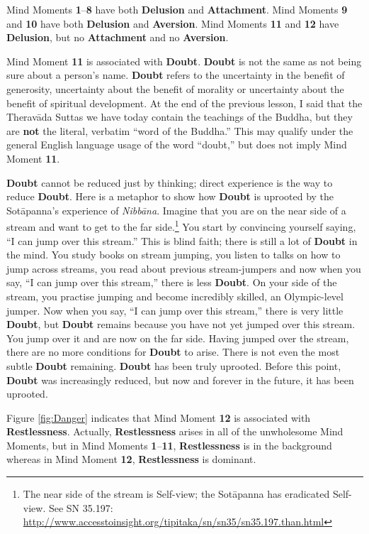 Mind Moments \textbf{1}--\textbf{8} have both \textbf{Delusion} and \textbf{Attachment}. Mind Moments \textbf{9} and \textbf{10} have both \textbf{Delusion} and \textbf{Aversion}. Mind Moments \textbf{11} and \textbf{12} have \textbf{Delusion}, but no \textbf{Attachment} and no \textbf{Aversion}.

Mind Moment \textbf{11} is associated with \textbf{Doubt}. \textbf{Doubt} is not the same as not being sure about a person’s name. \textbf{Doubt} refers to the uncertainty in the benefit of generosity, uncertainty about the benefit of morality or uncertainty about the benefit of spiritual development. At the end of the previous lesson, I said that the Theravāda Suttas we have today contain the teachings of the Buddha, but they are \textbf{not} the literal, verbatim “word of the Buddha.” This may qualify under the general English language usage of the word “doubt,” but does not imply Mind Moment \textbf{11}.

\textbf{Doubt} cannot be reduced just by thinking; direct experience is the way to reduce \textbf{Doubt}. Here is a metaphor to show how \textbf{Doubt} is uprooted by the Sotāpanna’s experience of \textit{Nibbāna}. Imagine that you are on the near side of a stream and want to get to the far side.\footnote{The near side of the stream is Self-view; the Sotāpanna has eradicated Self-view. See SN 35.197: \url{http://www.accesstoinsight.org/tipitaka/sn/sn35/sn35.197.than.html}} You start by convincing yourself saying, “I can jump over this stream.” This is blind faith; there is still a lot of \textbf{Doubt} in the mind. You study books on stream jumping, you listen to talks on how to jump across streams, you read about previous stream-jumpers and now when you say, “I can jump over this stream,” there is less \textbf{Doubt}. On your side of the stream, you practise jumping and become incredibly skilled, an Olympic-level jumper. Now when you say, “I can jump over this stream,” there is very little \textbf{Doubt}, but \textbf{Doubt} remains because you have not yet jumped over this stream. You jump over it and are now on the far side. Having jumped over the stream, there are no more conditions for \textbf{Doubt} to arise. There is not even the most subtle \textbf{Doubt} remaining. \textbf{Doubt} has been truly uprooted. Before this point, \textbf{Doubt} was increasingly reduced, but now and forever in the future, it has been uprooted.

Figure \ref{fig:Danger} indicates that Mind Moment \textbf{12} is associated with \textbf{Restlessness}. Actually, \textbf{Restlessness} arises in all of the unwholesome Mind Moments, but in Mind Moments \textbf{1}--\textbf{11}, \textbf{Restlessness} is in the background whereas in Mind Moment \textbf{12}, \textbf{Restlessness} is dominant.

